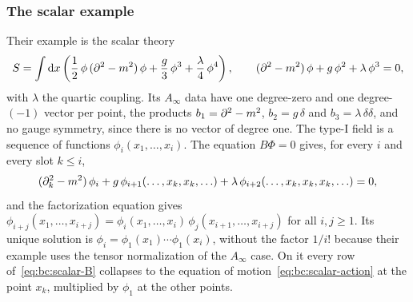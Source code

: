 \subsubsection{The scalar example}
\label{sec:bc:scalar}

Their example is the scalar theory
\begin{equation}
  \label{eq:bc:scalar-action}
  S
    = \int \mathrm{d} x \left(
      \frac{1}{2} \, \phi \, (\partial^2 - m^2) \, \phi
      + \frac{g}{3} \, \phi^3
      + \frac{\lambda}{4} \, \phi^4
    \right),
  \qquad
  (\partial^2 - m^2) \, \phi + g \, \phi^2 + \lambda \, \phi^3
    = 0,
\end{equation}
with $\lambda$ the quartic coupling.
Its $A_\infty$ data have one degree-zero and one degree-$(-1)$ vector per point, the products $b_1 = \partial^2 - m^2$, $b_2 = g \, \delta$ and $b_3 = \lambda \, \delta \delta$, and no gauge symmetry, since there is no vector of degree one.
The type-I field is a sequence of functions $\phi_i(x_1, \ldots, x_i)$.
The equation $B \Phi = 0$ gives, for every $i$ and every slot $k \le i$,
\begin{equation}
  \label{eq:bc:scalar-B}
  (\partial_k^2 - m^2) \, \phi_i
    + g \, \phi_{i+1}(\ldots, x_k, x_k, \ldots)
    + \lambda \, \phi_{i+2}(\ldots, x_k, x_k, x_k, \ldots)
    = 0,
\end{equation}
and the factorization equation gives $\phi_{i+j}(x_1, \ldots, x_{i+j}) = \phi_i(x_1, \ldots, x_i) \, \phi_j(x_{i+1}, \ldots, x_{i+j})$ for all $i, j \ge 1$.
Its unique solution is $\phi_i = \phi_1(x_1) \cdots \phi_1(x_i)$, without the factor $1 / i!$ because their example uses the tensor normalization of the $A_\infty$ case.
On it every row of~\eqref{eq:bc:scalar-B} collapses to the equation of motion~\eqref{eq:bc:scalar-action} at the point $x_k$, multiplied by $\phi_1$ at the other points.

